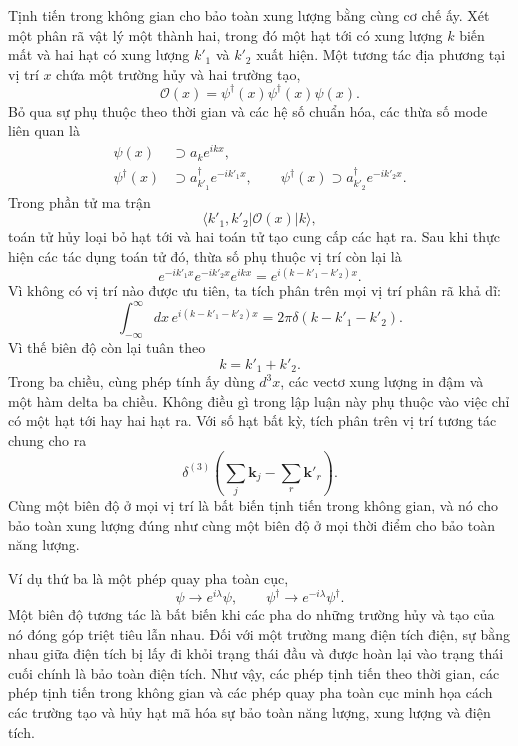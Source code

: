 Tịnh tiến trong không gian cho bảo toàn xung lượng bằng cùng cơ chế ấy. Xét một phân rã vật lý một thành hai, trong đó một hạt tới có xung lượng \(k\) biến mất và hai hạt có xung lượng \(k'_1\) và \(k'_2\) xuất hiện. Một tương tác địa phương tại vị trí \(x\) chứa một trường hủy và hai trường tạo,
\begin{equation}
\mathcal{O}(x)=\psi^\dagger(x)\psi^\dagger(x)\psi(x).
\end{equation}
Bỏ qua sự phụ thuộc theo thời gian và các hệ số chuẩn hóa, các thừa số mode liên quan là
\begin{align}
\psi(x)&\supset a_k e^{ikx},
\\
\psi^\dagger(x)&\supset a_{k'_1}^\dagger e^{-ik'_1x},
\qquad
\psi^\dagger(x)\supset a_{k'_2}^\dagger e^{-ik'_2x}.
\end{align}
Trong phần tử ma trận
\begin{equation}
\langle k'_1,k'_2|\mathcal{O}(x)|k\rangle,
\end{equation}
toán tử hủy loại bỏ hạt tới và hai toán tử tạo cung cấp các hạt ra. Sau khi thực hiện các tác dụng toán tử đó, thừa số phụ thuộc vị trí còn lại là
\begin{equation}
e^{-ik'_1x}e^{-ik'_2x}e^{ikx}
=e^{i(k-k'_1-k'_2)x}.
\end{equation}
Vì không có vị trí nào được ưu tiên, ta tích phân trên mọi vị trí phân rã khả dĩ:
\begin{equation}
\int_{-\infty}^{\infty}dx\,
e^{i(k-k'_1-k'_2)x}
=2\pi\delta(k-k'_1-k'_2).
\end{equation}
Vì thế biên độ còn lại tuân theo
\begin{equation}
k=k'_1+k'_2.
\end{equation}
Trong ba chiều, cùng phép tính ấy dùng \(d^3x\), các vectơ xung lượng in đậm và một hàm delta ba chiều. Không điều gì trong lập luận này phụ thuộc vào việc chỉ có một hạt tới hay hai hạt ra. Với số hạt bất kỳ, tích phân trên vị trí tương tác chung cho ra
\begin{equation}
\delta^{(3)}\!\left(
\sum_j\mathbf{k}_j-\sum_r\mathbf{k}'_r
\right).
\end{equation}
Cùng một biên độ ở mọi vị trí là bất biến tịnh tiến trong không gian, và nó cho bảo toàn xung lượng đúng như cùng một biên độ ở mọi thời điểm cho bảo toàn năng lượng.

Ví dụ thứ ba là một phép quay pha toàn cục,
\begin{equation}
\psi\longrightarrow e^{i\lambda}\psi,
\qquad
\psi^\dagger\longrightarrow e^{-i\lambda}\psi^\dagger.
\end{equation}
Một biên độ tương tác là bất biến khi các pha do những trường hủy và tạo của nó đóng góp triệt tiêu lẫn nhau. Đối với một trường mang điện tích điện, sự bằng nhau giữa điện tích bị lấy đi khỏi trạng thái đầu và được hoàn lại vào trạng thái cuối chính là bảo toàn điện tích. Như vậy, các phép tịnh tiến theo thời gian, các phép tịnh tiến trong không gian và các phép quay pha toàn cục minh họa cách các trường tạo và hủy hạt mã hóa sự bảo toàn năng lượng, xung lượng và điện tích.

